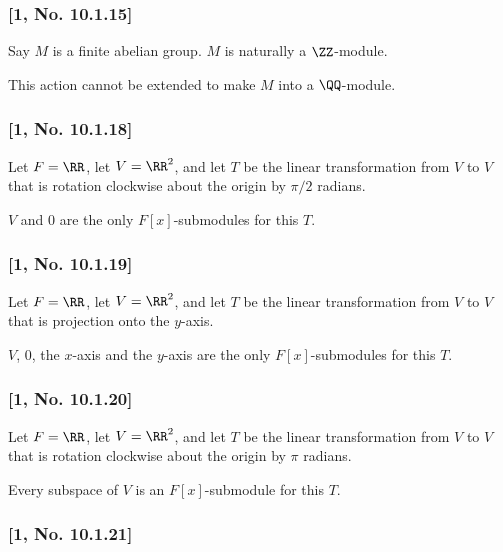 \documentclass[11pt]{amsart}
\begin{document}
\subsubsection{\texorpdfstring{{[}1, No.
10.1.15{]}}{, number 10.1.15{[}1, No. 10.1.15{]}}}

\gvn Say \(M\) is a finite abelian group. \(M\) is naturally a
\(\ZZ\)-module.

\wts This action cannot be extended to make \(M\) into a \(\QQ\)-module.

\subsubsection{\texorpdfstring{{[}1, No.
10.1.18{]}}{, number 10.1.18{[}1, No. 10.1.18{]}}}

\gvn Let \(F = \RR\), let \(V = \RR^2\), and let \(T\) be the linear
transformation from \(V\) to \(V\) that is rotation clockwise about the
origin by \(\pi / 2\) radians.

\wts \(V\) and \(0\) are the only \(F[x]\)-submodules for this \(T\).

\subsubsection{\texorpdfstring{{[}1, No.
10.1.19{]}}{, number 10.1.19{[}1, No. 10.1.19{]}}}

\gvn Let \(F = \RR\), let \(V = \RR^2\), and let \(T\) be the linear
transformation from \(V\) to \(V\) that is projection onto the
\(y\)-axis.

\wts \(V\), \(0\), the \(x\)-axis and the \(y\)-axis are the only
\(F[x]\)-submodules for this \(T\).

\subsubsection{\texorpdfstring{{[}1, No.
10.1.20{]}}{, number 10.1.20{[}1, No. 10.1.20{]}}}

\gvn Let \(F = \RR\), let \(V = \RR^2\), and let \(T\) be the linear
transformation from \(V\) to \(V\) that is rotation clockwise about the
origin by \(\pi\) radians.

\wts Every subspace of \(V\) is an \(F[x]\)-submodule for this \(T\).

\subsubsection{\texorpdfstring{{[}1, No.
10.1.21{]}}{, number 10.1.21{[}1, No. 10.1.21{]}}}
\end{document}
